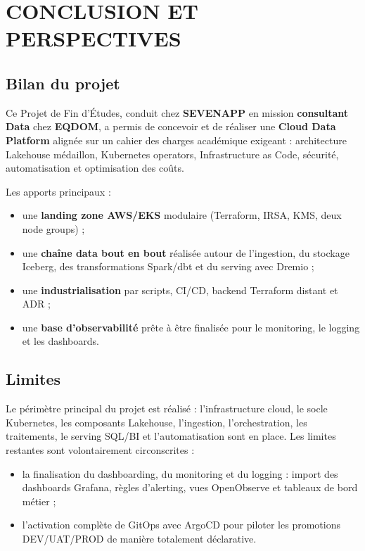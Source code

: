 \chapter{CONCLUSION ET PERSPECTIVES}
\label{ch:conclusion}

\section{Bilan du projet}

Ce Projet de Fin d'Études, conduit chez \textbf{SEVENAPP} en mission \textbf{consultant Data} chez \textbf{EQDOM}, a permis de concevoir et de réaliser une \textbf{Cloud Data Platform} alignée sur un cahier des charges académique exigeant : architecture Lakehouse médaillon, Kubernetes operators, Infrastructure as Code, sécurité, automatisation et optimisation des coûts.

Les apports principaux :
\begin{itemize}
    \item une \textbf{landing zone AWS/EKS} modulaire (Terraform, IRSA, KMS, deux node groups) ;
    \item une \textbf{chaîne data bout en bout} réalisée autour de l'ingestion, du stockage Iceberg, des transformations Spark/dbt et du serving avec Dremio ;
    \item une \textbf{industrialisation} par scripts, CI/CD, backend Terraform distant et ADR ;
    \item une \textbf{base d'observabilité} prête à être finalisée pour le monitoring, le logging et les dashboards.
\end{itemize}

\section{Limites}

Le périmètre principal du projet est réalisé : l'infrastructure cloud, le socle Kubernetes, les composants Lakehouse, l'ingestion, l'orchestration, les traitements, le serving SQL/BI et l'automatisation sont en place. Les limites restantes sont volontairement circonscrites :

\begin{itemize}
    \item la finalisation du dashboarding, du monitoring et du logging : import des dashboards Grafana, règles d'alerting, vues OpenObserve et tableaux de bord métier ;
    \item l'activation complète de GitOps avec ArgoCD pour piloter les promotions DEV/UAT/PROD de manière totalement déclarative.
\end{itemize}


